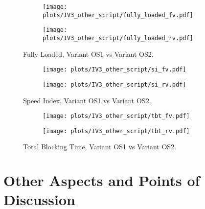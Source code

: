 \begin{figure}
	\centering
	\begin{subfigure}{.5\textwidth}
		\centering
		\texttt{[image: plots/IV3\_other\_script/fully\_loaded\_fv.pdf]}
		\label{fig:sub1}
	\end{subfigure}%
	\begin{subfigure}{.5\textwidth}
		\centering
		\texttt{[image: plots/IV3\_other\_script/fully\_loaded\_rv.pdf]}
		\label{fig:sub2}
	\end{subfigure}
	\caption{Fully Loaded, Variant OS1 vs Variant OS2.}
	\label{figure:plt_original_test}
\end{figure}


\begin{figure}
	\centering
	\begin{subfigure}{.5\textwidth}
		\centering
		\texttt{[image: plots/IV3\_other\_script/si\_fv.pdf]}
		\label{fig:sub1}
	\end{subfigure}%
	\begin{subfigure}{.5\textwidth}
		\centering
		\texttt{[image: plots/IV3\_other\_script/si\_rv.pdf]}
		\label{fig:sub2}
	\end{subfigure}
	\caption{Speed Index, Variant OS1 vs Variant OS2.}
	\label{figure:plt_original_test}
\end{figure}


\begin{figure}
	\centering
	\begin{subfigure}{.5\textwidth}
		\centering
		\texttt{[image: plots/IV3\_other\_script/tbt\_fv.pdf]}
		\label{fig:sub1}
	\end{subfigure}%
	\begin{subfigure}{.5\textwidth}
		\centering
		\texttt{[image: plots/IV3\_other\_script/tbt\_rv.pdf]}
		\label{fig:sub2}
	\end{subfigure}
	\caption{Total Blocking Time, Variant OS1 vs Variant OS2.}
	\label{figure:plt_original_test}
\end{figure}

\clearpage




\section{Other Aspects and Points of Discussion}

